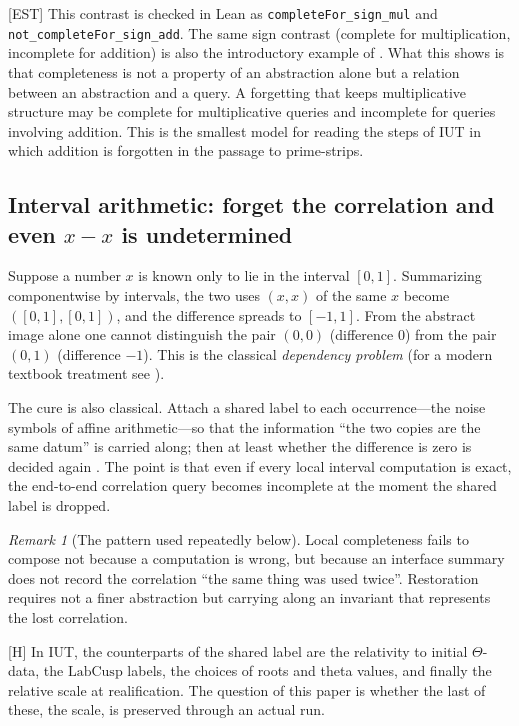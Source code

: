 \documentclass[11pt]{article}
\theoremstyle{plain}
\theoremstyle{definition}
\theoremstyle{remark}
\newtheorem{remark}[theorem]{Remark}
\newcommand{\EST}{\textup{[EST]}}
\newcommand{\Hmark}{\textup{[H]}}
\begin{document}
\EST{} This contrast is checked in Lean as
\texttt{completeFor\_sign\_mul} and \texttt{not\_completeFor\_sign\_add}.
The same sign contrast (complete for multiplication, incomplete for
addition) is also the introductory example of \cite{GRS00}.  What
this shows is that completeness is not a property of an abstraction
alone but a relation between an abstraction and a query.  A
forgetting that keeps multiplicative structure may be complete for
multiplicative queries and incomplete for queries involving
addition.  This is the smallest model for reading the steps of IUT
in which addition is forgotten in the passage to prime-strips.

\subsection{Interval arithmetic: forget the correlation and even
$x-x$ is undetermined}

Suppose a number $x$ is known only to lie in the interval $[0,1]$.
Summarizing componentwise by intervals, the two uses $(x,x)$ of the
same $x$ become $([0,1],[0,1])$, and the difference spreads to
$[-1,1]$.  From the abstract image alone one cannot distinguish the
pair $(0,0)$ (difference $0$) from the pair $(0,1)$ (difference
$-1$).  This is the classical \emph{dependency problem}
\cite{Moore} (for a modern textbook treatment see \cite{MKC09}).

The cure is also classical.  Attach a shared label to each
occurrence---the noise symbols of affine arithmetic---so that the
information ``the two copies are the same datum'' is carried along;
then at least whether the difference is zero is decided again
\cite{FigStolfi}.  The point is that even if every local interval
computation is exact, the end-to-end correlation query becomes
incomplete at the moment the shared label is dropped.

\begin{remark}[The pattern used repeatedly below]
Local completeness fails to compose not because a computation is
wrong, but because an interface summary does not record the
correlation ``the same thing was used twice''.  Restoration requires
not a finer abstraction but carrying along an invariant that
represents the lost correlation.
\end{remark}

\Hmark{} In IUT, the counterparts of the shared label are the
relativity to initial $\Theta$-data, the $\mathrm{LabCusp}$ labels,
the choices of roots and theta values, and finally the relative
scale at realification.  The question of this paper is whether the
last of these, the scale, is preserved through an actual run.
\end{document}
